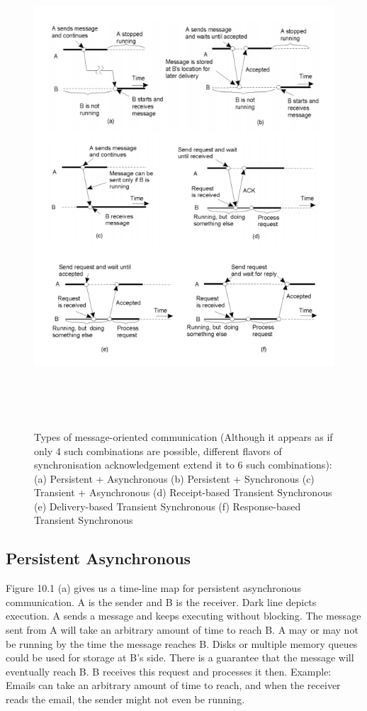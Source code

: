 \documentclass[twoside]{article}
\begin{document}
\begin{figure}
\includegraphics[width=15cm, height=18cm]{Axes.png}
\centering
\caption{Types of message-oriented communication (Although it appears as if only 4 such combinations are possible, different flavors of synchronisation acknowledgement extend it to 6 such combinations): (a) Persistent + Asynchronous (b) Persistent + Synchronous (c) Transient + Asynchronous (d) Receipt-based Transient Synchronous (e) Delivery-based Transient Synchronous (f) Response-based Transient Synchronous}
\end{figure}

\subsection{Persistent Asynchronous}
Figure 10.1 (a) gives us a time-line map for persistent asynchronous communication. A is the sender and B is the receiver. Dark line depicts execution. A sends a message and keeps executing without blocking. The message sent from A will take an arbitrary amount of time to reach B. A may or may not be running by the time the message reaches B. Disks or multiple memory queues could be used for storage at B's side. There is a guarantee that the message will eventually reach B. B receives this request and processes it then. Example: Emails can take an arbitrary amount of time to reach, and when the receiver reads the email, the sender might not even be running. 
\end{document}
